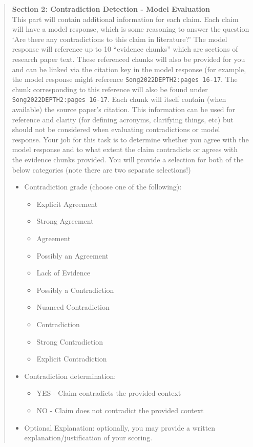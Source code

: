 \begin{quote}
\textbf{Section 2: Contradiction Detection - Model Evaluation}\\
This part will contain additional information for each claim. Each claim will have a model response, which is some reasoning to answer the question `Are there any contradictions to this claim in literature?' The model response will reference up to 10 “evidence chunks” which are sections of research paper text.
These referenced chunks will also be provided for you and can be linked via the citation key in the model response (for example, the model response might reference \texttt{Song2022DEPTH2:pages 16-17}. The chunk corresponding to this reference will also be found under \texttt{Song2022DEPTH2:pages 16-17}.
Each chunk will itself contain (when available) the source paper's citation. This information can be used for reference and clarity (for defining acronyms, clarifying things, etc) but should not be considered when evaluating contradictions or model response.
Your job for this task is to determine whether you agree with the model response and to what extent the claim contradicts or agrees with the evidence chunks provided.
You will provide a selection for both of the below categories (note there are two separate selections!)
\begin{itemize}
    \item Contradiction grade (choose one of the following):
        \begin{itemize}
            \item Explicit Agreement
            \item Strong Agreement
            \item Agreement
            \item Possibly an Agreement
            \item Lack of Evidence
            \item Possibly a Contradiction
            \item Nuanced Contradiction
            \item Contradiction
            \item Strong Contradiction
            \item Explicit Contradiction
        \end{itemize}
    \item Contradiction determination:
        \begin{itemize}
            \item YES - Claim contradicts the provided context
            \item NO - Claim does not contradict the provided context
        \end{itemize}
    \item Optional Explanation: optionally, you may provide a written explanation/justification of your scoring.
\end{itemize}


\end{quote}
